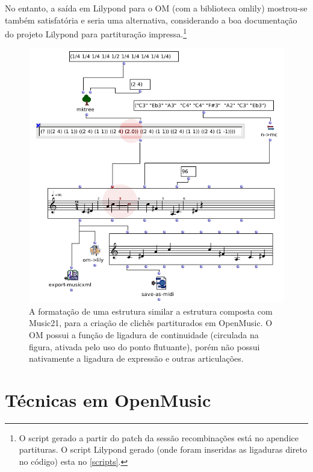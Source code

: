 \documentclass[
	12pt,				%
	openright,			%
	twoside,			%
	a4paper,			%
	english,			%
	french,				%
	spanish,			%
	brazil				%
	]{abntex2}
\begin{document}
No entanto, a saída em Lilypond para o OM (com a biblioteca omlily) mostrou-se também satisfatória e seria uma alternativa, considerando a boa documentação do projeto Lilypond para partituração impressa.\footnote{O script gerado a partir do patch da sessão recombinações está no apendice partituras. O script Lilypond gerado (onde foram inseridas as ligaduras direto no código) esta no \autoref{scripts}. }

\begin{figure}[!h]
	\caption{\label{fig_grafico}A formatação de uma estrutura similar a estrutura composta com Music21, para a criação de clichês partiturados em OpenMusic. O OM possui a função de ligadura de continuidade (circulada na figura, ativada pelo uso do ponto flutuante), porém não possui nativamente a ligadura de expressão e outras articulações. }
	\begin{center}
	    \includegraphics[scale=0.6]{OMPD/PolirritmoOM.png}
	\end{center}
\end{figure}





\section{Técnicas em OpenMusic}
\end{document}
